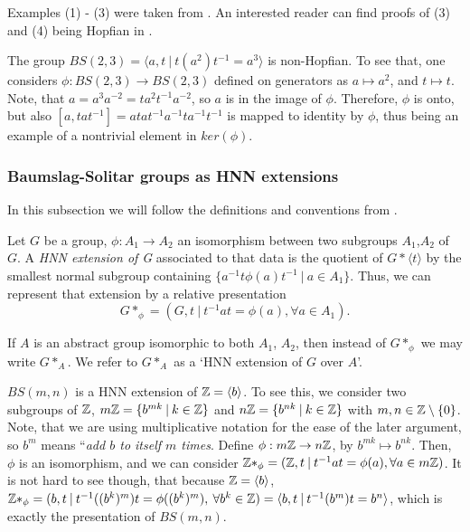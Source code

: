 Examples (1) - (3) were taken from \cite{CeSi23}. An interested reader can find proofs of (3) and (4) being Hopfian in \cite[~chapters I, IV]{LySch15}. 

\begin{importantexample}\cite[page 514]{BrHa11}
    The group $BS(2,3) = \langle a,t \: | \: t(a^2)t^{-1} = a^3\rangle $ is non-Hopfian. To see that, one considers $\phi: BS(2,3) \to BS(2,3)$ defined on generators as $a \mapsto a^2$, and $t \mapsto t$. Note, that $a = a^3a^{-2} = ta^2t^{-1}a^{-2}$, so $a$ is in the image of $\phi$. Therefore, $\phi$ is onto, but also $[a,tat^{-1}] = atat^{-1}a^{-1}ta^{-1}t^{-1}$ is mapped to identity by $\phi$, thus being an example of a nontrivial element in $ker(\phi)$.
\end{importantexample}

\subsubsection{Baumslag-Solitar groups as HNN extensions}

In this subsection we will follow the definitions and conventions from \cite[pages 497-498]{BrHa11}.

\begin{definition}
\label{HNN}
    Let $G$ be a group, $\phi: A_1 \to A_2$ an isomorphism between two subgroups $A_1$,$A_2$ of $G$. A \emph{HNN extension of G} associated to that data is the quotient of $G \ast \langle t \rangle$ by the smallest normal subgroup containing $\{a^{-1}t\phi(a)t^{-1} \: | \: a \in A_1 \}$. Thus, we can represent that extension by a relative presentation 
    \[G \ast_\phi = ( G,t \: | \: t^{-1}at = \phi(a), \forall a \in A_1). \]
\end{definition}

\begin{remark}
    If $A$ is an abstract group isomorphic to both $A_1$, $A_2$, then instead of $G \ast _\phi$ we may write $G \ast _A$. We refer to $G \ast _A$ as a `HNN extension of $G$ over $A$'.
\end{remark}

\begin{example}\label{BS as HNN}
    $BS(m,n)$ is a HNN extension of $\mathbb{Z}  =\langle b \rangle$. To see this, we consider two subgroups of $\mathbb{Z}$, $m\mathbb{Z} = \{b^{mk}\: | \: k \in \mathbb{Z}\}$ and $n\mathbb{Z} = \{b^{nk}\: | \: k \in \mathbb{Z}\}$ with $m,n \in \mathbb{Z} \setminus \{0\}$. Note, that we are using multiplicative notation for the ease of the later argument, so $b^m$ means ``\emph{add $b$ to itself $m$ times}. Define $\phi: m\mathbb{Z} \to n\mathbb{Z}$, by $b^{mk} \mapsto b^{nk}$. Then, $\phi$ is an isomorphism, and we can consider $\mathbb{Z}\ast_\phi = (\mathbb{Z},t \: | \: t^{-1}at = \phi(a), \forall a\in m\mathbb{Z})$. It is not hard to see though, that because $\mathbb{Z} = \langle b \rangle$, $\mathbb{Z}\ast_\phi = ( b,t \: | \: t^{-1}((b^k)^m)t = \phi((b^k)^m), \: \forall b^k\in \mathbb{Z} ) = \langle b,t \: | \: t^{-1}(b^m)t = b^n\rangle $, which is exactly the presentation of $BS(m,n)$.
\end{example}

